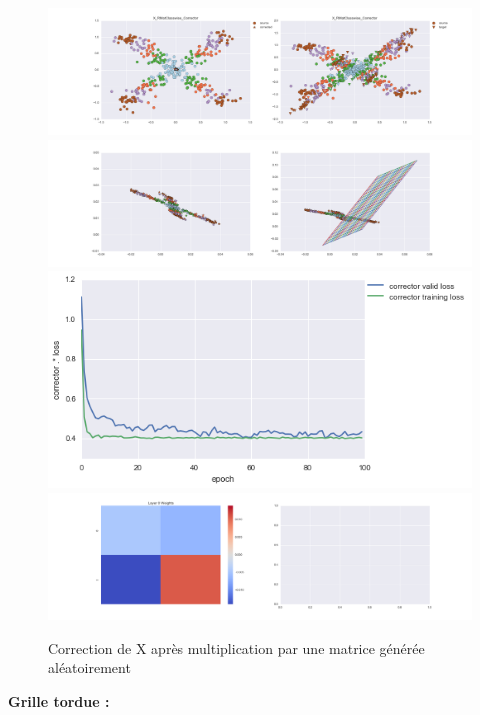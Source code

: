 \begin{figure}[H] %
\centering
\includegraphics[width=\linewidth]{fig/24-05-2016/X/X_RMatClasswise_Corrector-DATA.png}
\includegraphics[width=\linewidth]{fig/24-05-2016/X/X_RMatClasswise_Corrector-GridCheck.png}
\includegraphics[width=0.45\linewidth]{fig/24-05-2016/X/X_RMatClasswise_Corrector-Learning_curve.png}
\includegraphics[width=\linewidth]{fig/24-05-2016/X/X_RMatClasswise_Corrector-W.png}
\caption{Correction de X après multiplication par une matrice générée aléatoirement}
\label{fig:recap-X-RMat-classwise}
\end{figure}

{\Large \textbf{Grille tordue :}}

